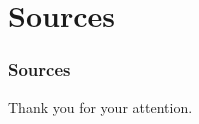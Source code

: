 \section{Sources}

\begin{frame}[allowframebreaks]
	\frametitle{Sources}
	\nocite{*}
%	
%	
	\printbibliography
\end{frame}


\begin{frame}[plain]
	\begin{center}
		\Large{{Thank you for your attention.}}
	\end{center}
\end{frame}

\frame[plain]


